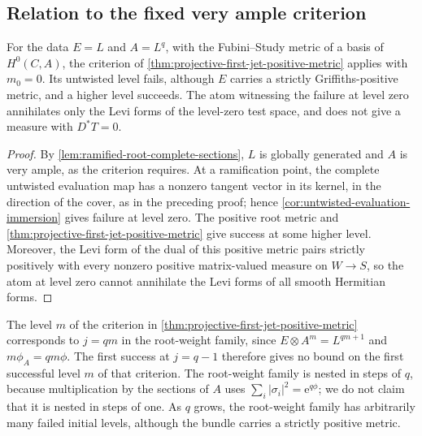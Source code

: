 \subsection{Relation to the fixed very ample criterion}

\begin{corollary}\label{cor:ramified-positive-untwisted-failure}
For the data $E=L$ and $A=L^q$, with the Fubini--Study metric of a basis of $H^0(C,A)$, the criterion of \cref{thm:projective-first-jet-positive-metric} applies with $m_0=0$. Its untwisted level fails, although $E$ carries a strictly Griffiths-positive metric, and a higher level succeeds. The atom witnessing the failure at level zero annihilates only the Levi forms of the level-zero test space, and does not give a measure with $D^*T=0$.
\end{corollary}
\begin{proof}
By \cref{lem:ramified-root-complete-sections}, $L$ is globally generated and $A$ is very ample, as the criterion requires. At a ramification point, the complete untwisted evaluation map has a nonzero tangent vector in its kernel, in the direction of the cover, as in the preceding proof; hence \cref{cor:untwisted-evaluation-immersion} gives failure at level zero. The positive root metric and \cref{thm:projective-first-jet-positive-metric} give success at some higher level. Moreover, the Levi form of the dual of this positive metric pairs strictly positively with every nonzero positive matrix-valued measure on $W\to S$, so the atom at level zero cannot annihilate the Levi forms of all smooth Hermitian forms.
\end{proof}

The level $m$ of the criterion in \cref{thm:projective-first-jet-positive-metric} corresponds to $j=qm$ in the root-weight family, since $E\otimes A^m=L^{qm+1}$ and $m\phi_A=qm\phi$. The first success at $j=q-1$ therefore gives no bound on the first successful level $m$ of that criterion. The root-weight family is nested in steps of $q$, because multiplication by the sections of $A$ uses $\sum_i|\sigma_i|^2=\mathrm e^{q\phi}$; we do not claim that it is nested in steps of one. As $q$ grows, the root-weight family has arbitrarily many failed initial levels, although the bundle carries a strictly positive metric.
